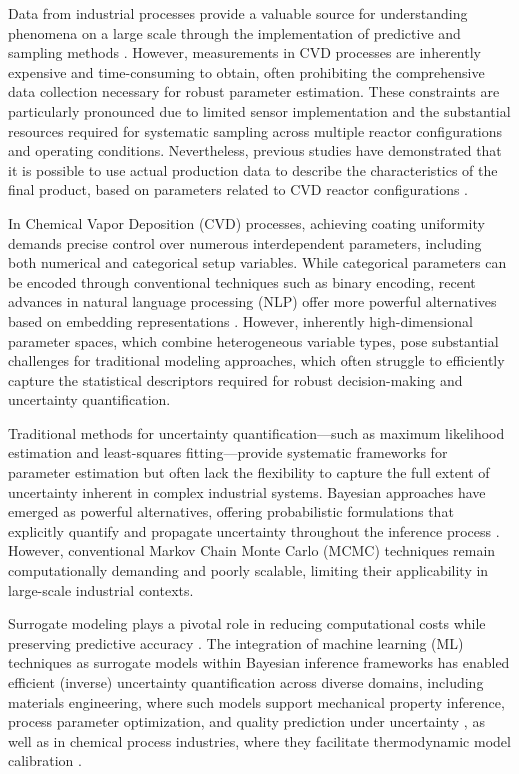 \documentclass{article}
\begin{document}
	Data from industrial processes provide a valuable source for understanding phenomena on a large scale through the implementation of predictive and sampling methods \cite{papavasileiou2024integrating}. However, measurements in CVD processes are inherently expensive and time-consuming to obtain, often prohibiting the comprehensive data collection necessary for robust parameter estimation. These constraints are particularly pronounced due to limited sensor implementation and the substantial resources required for systematic sampling across multiple reactor configurations and operating conditions. Nevertheless, previous studies have demonstrated that it is possible to use actual production data to describe the characteristics of the final product, based on parameters related to CVD reactor configurations \cite{papavasileiou2024integrating, KORONAKI2025109146}.
	
	In Chemical Vapor Deposition (CVD) processes, achieving coating uniformity demands precise control over numerous interdependent parameters, including both numerical and categorical setup variables. While categorical parameters can be encoded through conventional techniques such as binary encoding, recent advances in natural language processing (NLP) offer more powerful alternatives based on embedding representations \cite{KORONAKI2025109146}. However, inherently high-dimensional parameter spaces, which combine heterogeneous variable types, pose substantial challenges for traditional modeling approaches, which often struggle to efficiently capture the statistical descriptors required for robust decision-making and uncertainty quantification.
	
	Traditional methods for uncertainty quantification—such as maximum likelihood estimation and least-squares fitting—provide systematic frameworks for parameter estimation but often lack the flexibility to capture the full extent of uncertainty inherent in complex industrial systems. Bayesian approaches have emerged as powerful alternatives, offering probabilistic formulations that explicitly quantify and propagate uncertainty throughout the inference process \cite{dornheimModelFreeAdaptiveOptimal2020,humfeldMachineLearningFramework2021}. However, conventional Markov Chain Monte Carlo (MCMC) techniques remain computationally demanding and poorly scalable, limiting their applicability in large-scale industrial contexts.
	
	Surrogate modeling plays a pivotal role in reducing computational costs while preserving predictive accuracy \cite{humfeldMachineLearningFramework2021}. The integration of machine learning (ML) techniques as surrogate models within Bayesian inference frameworks has enabled efficient (inverse) uncertainty quantification across diverse domains, including materials engineering, where such models support mechanical property inference, process parameter optimization, and quality prediction under uncertainty \cite{lepickaInitialEvaluationPerformance2019, malleyPredictabilityMechanicalBehavior2022, RAILLON2018818}, as well as in chemical process industries, where they facilitate thermodynamic model calibration \cite{PAULSON201974}.
	
\end{document}
